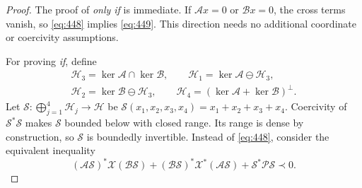 \documentclass[10pt,a4paper]{article}
\newcommand{\extra}[1]{\textcolor{assumption}{#1}}
\newcommand{\op}[1]{\mathcal{#1}}
\begin{document}
\begin{proof}
The proof of \emph{only if} is immediate. If $\op Ax=0$ or $\op Bx=0$,
the cross terms vanish, so \eqref{eq:448} implies \eqref{eq:449}.
This direction needs no additional coordinate or coercivity assumptions.

For proving \emph{if}, define
\[
 \begin{gathered}
 \op H_3=\ker\op A\cap\ker\op B,\qquad
 \op H_1=\ker\op A\ominus\op H_3,\\
 \op H_2=\ker\op B\ominus\op H_3,\qquad
 \op H_4=(\ker\op A+\ker\op B)^\perp.
 \end{gathered}
\]
Let $\op S:\bigoplus_{j=1}^4\op H_j\to\op H$ be
$\op S(x_1,x_2,x_3,x_4)=x_1+x_2+x_3+x_4$.
\extra{Coercivity of $\op S^*\op S$ makes $\op S$ bounded below
with closed range. Its range is dense by construction, so $\op S$
is boundedly invertible.}
Instead of \eqref{eq:448}, consider the equivalent inequality
\begin{equation}\tag{4.4.11}\label{eq:4411}
 (\op A\op S)^*\op X(\op B\op S)
 +(\op B\op S)^*\op X^*(\op A\op S)
 +\op S^*\op P\op S\prec0.
\end{equation}


\end{proof}
\end{document}

